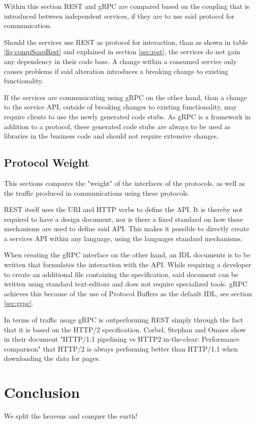 \documentclass[conference]{IEEEtran}
\begin{document}
Within this section REST and gRPC are compared based on the coupling that is introduced between independent services, if they are to use said protocol for communication.

Should the services use REST as protocol for interaction, than as shown in table \ref{fig:compSoapRest} and explained in section \ref{sec:rest}, the services do not gain any dependency in their code base. A change within a consumed service only causes problems if said alteration introduces a breaking change to existing functionality.

If the services are communicating using gRPC on the other hand, than a change to the service API, outside of breaking changes to existing functionality, may require clients to use the newly generated code stubs. As gRPC is a framework in addition to a protocol, these generated code stubs are always to be used as libraries in the business code and should not require extensive changes.

\subsection{Protocol Weight}

This sections compares the "weight" of the interfaces of the protocols, as well as the traffic produced in communications using these protocols.

REST itself uses the URI and HTTP verbs to define the API. It is thereby not required to have a design document, nor is there a fixed standard on how these mechanisms are used to define said API. This makes it possible to directly create a services API within any language, using the languages standard mechanisms.

When creating the gRPC interface on the other hand, an IDL documents is to be written that formulates the interaction with the API. While requiring a developer to create an additional file containing the specification, said document can be written using standard text-editors and does not require specialized tools. gRPC achieves this because of the use of Protocol Buffers as the default IDL, see section \ref{sec:grpc}. \newline

In terms of traffic usage gRPC is outperforming REST simply through the fact that it is based on the HTTP/2 specification. Corbel, Stephan and Omnes show in their document "HTTP/1.1 pipelining vs HTTP2 in-the-clear: Performance comparison" \cite{7745823} that HTTP/2 is always performing better than HTTP/1.1 when downloading the data for pages.

\section{Conclusion}

We split the heavens and conquer the earth!


\end{document}
